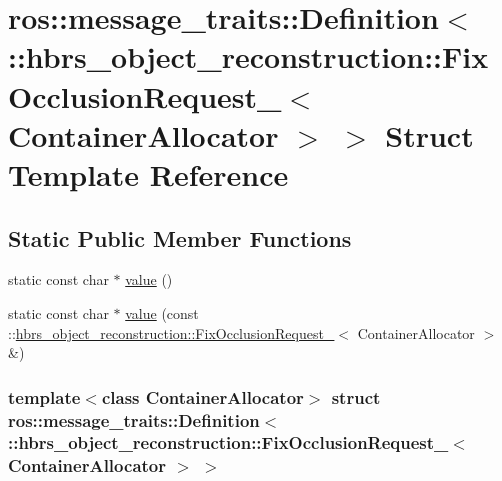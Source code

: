 \hypertarget{structros_1_1message__traits_1_1_definition_3_01_1_1hbrs__object__reconstruction_1_1_fix_occlusi0cd98eedd4d06825f259766097a412ce}{\section{ros\-:\-:message\-\_\-traits\-:\-:\-Definition$<$ \-:\-:hbrs\-\_\-object\-\_\-reconstruction\-:\-:\-Fix\-Occlusion\-Request\-\_\-$<$ \-Container\-Allocator $>$ $>$ \-Struct \-Template \-Reference}
\label{structros_1_1message__traits_1_1_definition_3_01_1_1hbrs__object__reconstruction_1_1_fix_occlusi0cd98eedd4d06825f259766097a412ce}
}
\subsection*{\-Static \-Public \-Member \-Functions}
\begin{DoxyCompactItemize}
\item 
static const char $\ast$ \hyperlink{structros_1_1message__traits_1_1_definition_3_01_1_1hbrs__object__reconstruction_1_1_fix_occlusi0cd98eedd4d06825f259766097a412ce_acf5bee80a88362f42ecbbaa7e2c86794}{value} ()
\item 
static const char $\ast$ \hyperlink{structros_1_1message__traits_1_1_definition_3_01_1_1hbrs__object__reconstruction_1_1_fix_occlusi0cd98eedd4d06825f259766097a412ce_a4a2fb307e5004f3d46d250586b894231}{value} (const \-::\hyperlink{structhbrs__object__reconstruction_1_1_fix_occlusion_request__}{hbrs\-\_\-object\-\_\-reconstruction\-::\-Fix\-Occlusion\-Request\-\_\-}$<$ \-Container\-Allocator $>$ \&)
\end{DoxyCompactItemize}
\subsubsection*{template$<$class Container\-Allocator$>$ struct ros\-::message\-\_\-traits\-::\-Definition$<$ \-::hbrs\-\_\-object\-\_\-reconstruction\-::\-Fix\-Occlusion\-Request\-\_\-$<$ Container\-Allocator $>$ $>$}



